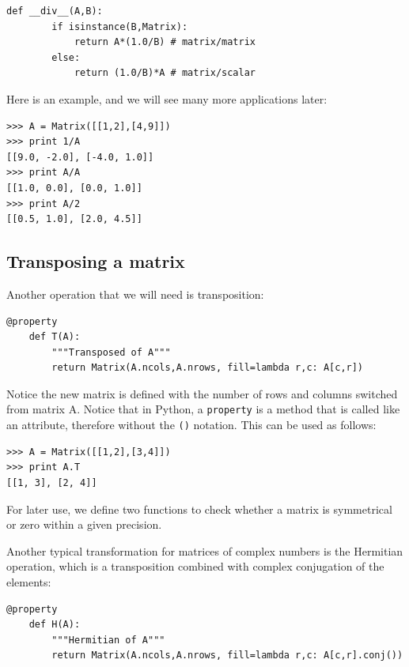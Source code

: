 \documentclass[justified,sixbynine]{tufte-book}
\def\ft{\small\tt}
\theoremstyle{plain}%
\theoremstyle{definition}
\theoremstyle{remark}
\begin{document}
\begin{fullwidth}
\begin{lstlisting}[caption={in file: {\ft nlib.py}}]
    def __div__(A,B):
        if isinstance(B,Matrix):
            return A*(1.0/B) # matrix/matrix
        else:
            return (1.0/B)*A # matrix/scalar

\end{lstlisting}

Here is an example, and we will see many more applications later:

\begin{lstlisting}[caption={in file: {\ft nlib.py}}]
>>> A = Matrix([[1,2],[4,9]])
>>> print 1/A
[[9.0, -2.0], [-4.0, 1.0]]
>>> print A/A
[[1.0, 0.0], [0.0, 1.0]]
>>> print A/2
[[0.5, 1.0], [2.0, 4.5]]
\end{lstlisting}

\goodbreak\subsection{Transposing a matrix}


Another operation that we will need is transposition:

\begin{lstlisting}[caption={in file: {\ft nlib.py}}]
    @property
    def T(A):
        """Transposed of A"""
        return Matrix(A.ncols,A.nrows, fill=lambda r,c: A[c,r])
\end{lstlisting}

Notice the new matrix is defined with the number of rows and columns switched from matrix A. Notice that in Python, a {\ft property} is a method that is called like an attribute, therefore without the {\ft ()} notation.
This can be used as follows:

\begin{lstlisting}[caption={in file: {\ft nlib.py}}]
>>> A = Matrix([[1,2],[3,4]])
>>> print A.T
[[1, 3], [2, 4]]
\end{lstlisting}

For later use, we define two functions to check whether a matrix is symmetrical or zero within a given precision.

Another typical transformation for matrices of complex numbers is the Hermitian operation, which is a transposition combined with complex conjugation of the elements:

\begin{lstlisting}[caption={in file: {\ft nlib.py}}]
    @property
    def H(A):
        """Hermitian of A"""
        return Matrix(A.ncols,A.nrows, fill=lambda r,c: A[c,r].conj())
\end{lstlisting}


\end{fullwidth}
\end{document}
